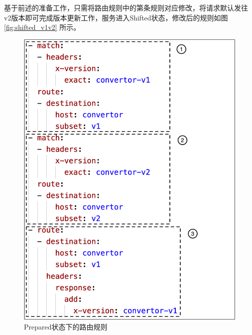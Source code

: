 \documentclass[macfonts,master]{njuthesis}
\begin{document}
基于前述的准备工作，只需将路由规则中的第条规则对应修改，将请求默认发往v2版本即可完成版本更新工作，服务进入Shifted状态，修改后的规则如图\ref{fig:shifted_v1v2} 所示。

\begin{figure}
  \centering
  \begin{minipage}[t]{0.48\textwidth}
  \centering
  \centerline{\includegraphics[width=1.0\textwidth]{image/prepared_v1v2.png}}
  \caption{Prepared状态下的路由规则}
  \label{fig:prepared_v1v2}
  \end{minipage}
  \begin{minipage}[t]{0.48\textwidth}
  \centering

\end{minipage}
\end{figure}
\end{document}
